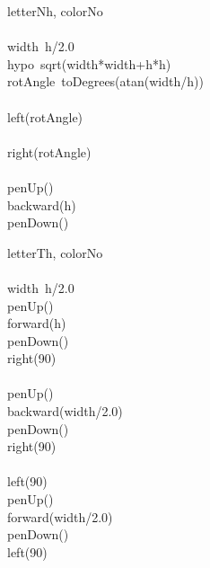 \documentclass[a4paper,10pt]{article}
\begin{document}
\begin{pseudocode}{letterN}{h, colorNo }
\label{letterN}
\\
\\
  width\gets\ h/2.0\\
  hypo\gets\ sqrt(width*width+h*h)\\
  rotAngle\gets\ toDegrees(atan(width/h))\\
  \\
  left(rotAngle)\\
  \\
  right(rotAngle)\\
  \\
  penUp()\\
  backward(h)\\
  penDown()\\
\ENDPROCEDURE
\end{pseudocode}


\begin{pseudocode}{letterT}{h, colorNo }
\label{letterT}
\\
\\
  width\gets\ h/2.0\\
  penUp()\\
  forward(h)\\
  penDown()\\
  right(90)\\
  \\
  penUp()\\
  backward(width/2.0)\\
  penDown()\\
  right(90)\\
  \\
  left(90)\\
  penUp()\\
  forward(width/2.0)\\
  penDown()\\
  left(90)\\
\ENDPROCEDURE
\end{pseudocode}
\end{document}
